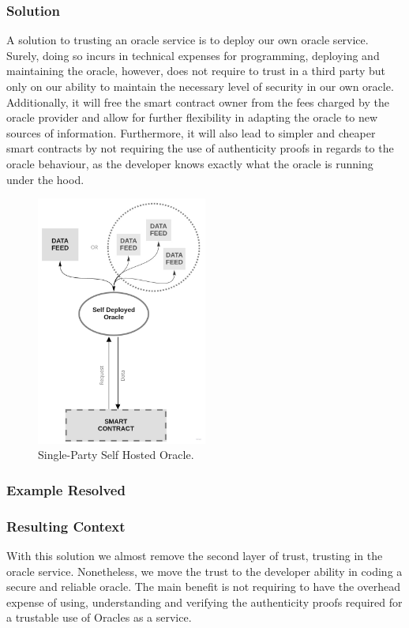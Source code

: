 \subsubsection{Solution}
A solution to trusting an oracle service is to deploy our own oracle service. Surely, doing so incurs in technical expenses for programming, deploying and maintaining the oracle, however, does not require to trust in a third party but only on our ability to maintain the necessary level of security in our own oracle. Additionally, it will free the smart contract owner from the fees charged by the oracle provider and allow for further flexibility in adapting the oracle to new sources of information. Furthermore, it will also lead to simpler and cheaper smart contracts by not requiring the use of authenticity proofs in regards to the oracle behaviour, as the developer knows exactly what the oracle is running under the hood.

\begin{figure}[t]
  \begin{center}
    \leavevmode
    \includegraphics[width=0.5\textwidth]{figures/oraclearch3.jpg}
    \caption{Single-Party Self Hosted Oracle.}
    \label{fig:/figures/paper-screening}
  \end{center}
\end{figure}


\subsubsection{Example Resolved}
\subsubsection{Resulting Context}
With this solution we almost remove the second layer of trust, trusting in the oracle service. Nonetheless, we move the trust to the developer ability in coding a secure and reliable oracle. The main benefit is not requiring to have the overhead expense of using, understanding and verifying the authenticity proofs required for a trustable use of Oracles as a service.

